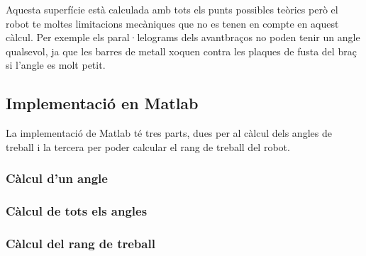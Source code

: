 Aquesta superfície està calculada amb tots els punts possibles teòrics però el robot te moltes limitacions mecàniques que no es tenen en compte en aquest càlcul. Per exemple els paral·lelograms dels avantbraços no poden tenir un angle qualsevol, ja que les barres de metall xoquen contra les plaques de fusta del braç si l'angle es molt petit.

\clearpage
\subsection{Implementació en Matlab}

La implementació de Matlab té tres parts, dues per al càlcul dels angles de treball i la tercera per poder calcular el rang de treball del robot.

\subsubsection{Càlcul d'un angle}


\newpage
\subsubsection{Càlcul de tots els angles}


\newpage
\subsubsection{Càlcul del rang de treball}

